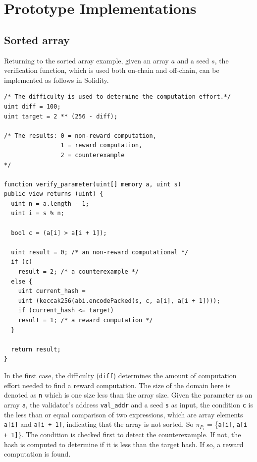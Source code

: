 \documentclass[runningheads]{llncs}
\begin{document}
\section{Prototype Implementations}
\subsection{Sorted array}

Returning to the sorted array example, given an array $a$ and a seed $s$, the verification function, which is used both on-chain and off-chain, can be implemented as follows in Solidity.
\begin{lstlisting}[numbers=none]
/* The difficulty is used to determine the computation effort.*/
uint diff = 100;
uint target = 2 ** (256 - diff); 

/* The results: 0 = non-reward computation,
                1 = reward computation, 
                2 = counterexample 
*/

function verify_parameter(uint[] memory a, uint s)
public view returns (uint) {
  uint n = a.length - 1; 
  uint i = s % n;
       
  bool c = (a[i] > a[i + 1]);

  uint result = 0; /* an non-reward computational */ 
  if (c)  
    result = 2; /* a counterexample */
  else {
    uint current_hash = 
    uint (keccak256(abi.encodePacked(s, c, a[i], a[i + 1])));
    if (current_hash <= target) 
    result = 1; /* a reward computation */ 
  }             
  
  return result;           
}

\end{lstlisting}

In the first case, the difficulty (\lstinline|diff|) determines the amount of computation effort needed to find a reward computation. The size of the domain here is denoted as \lstinline|n| which is one size less than the array size. Given the parameter as an array \lstinline|a|, the validator's address  \lstinline|val_addr| and a seed \lstinline|s| as input, the condition \lstinline|c| is the less than or equal comparison of two expressions, which are array elements \lstinline|a[i]| and \lstinline|a[i + 1]|, indicating that the array is not sorted. So $\pi_{P_{i}}$ = \{\lstinline|a[i]|, \lstinline|a[i + 1]|\}. 
The condition is checked first to detect the counterexample. If not, the hash is computed to determine if it is less than the target hash. If so, a reward computation is found.
\end{document}
